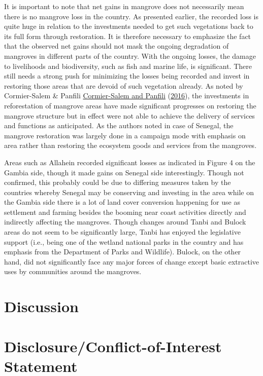 \documentclass[utf8]{frontiersSCNS}
\begin{document}
It is important to note that net gains in mangrove does not necessarily
mean there is no mangrove loss in the country. As presented earlier, the
recorded loss is quite huge in relation to the investments needed to get
such vegetations back to its full form through restoration. It is
therefore necessary to emphasize the fact that the observed net gains
should not mask the ongoing degradation of mangroves in different parts
of the country. With the ongoing losses, the damage to livelihoods and
biodiversity, such as fish and marine life, is significant. There still
needs a strong push for minimizing the losses being recorded and invest
in restoring those areas that are devoid of such vegetation already. As
noted by Cormier-Salem \& Panfili
\protect\hyperlink{ref-Cormier-Salem-and-Panfili-2016}{Cormier-Salem and
Panfili} (\protect\hyperlink{ref-Cormier-Salem-and-Panfili-2016}{2016}),
the investments in reforestation of mangrove areas have made significant
progresses on restoring the mangrove structure but in effect were not
able to achieve the delivery of services and functions as anticipated.
As the authors noted in case of Senegal, the mangrove restoration was
largely done in a campaign mode with emphasis on area rather than
restoring the ecosystem goods and services from the mangroves.

Areas such as Allahein recorded significant losses as indicated in
Figure 4 on the Gambia side, though it made gains on Senegal side
interestingly. Though not confirmed, this probably could be due to
differing measures taken by the countries whereby Senegal may be
conserving and investing in the area while on the Gambia side there is a
lot of land cover conversion happening for use as settlement and farming
besides the booming near coast activities directly and indirectly
affecting the mangroves. Though changes around Tanbi and Bulock areas do
not seem to be significantly large, Tanbi has enjoyed the legislative
support (i.e., being one of the wetland national parks in the country
and has emphasis from the Department of Parks and Wildlife). Bulock, on
the other hand, did not significantly face any major forces of change
except basic extractive uses by communities around the mangroves.

\hypertarget{discussion}{%
\section*{Discussion}\label{discussion}}

\hypertarget{disclosureconflict-of-interest-statement}{%
\section*{Disclosure/Conflict-of-Interest
Statement}\label{disclosureconflict-of-interest-statement}}
\end{document}
